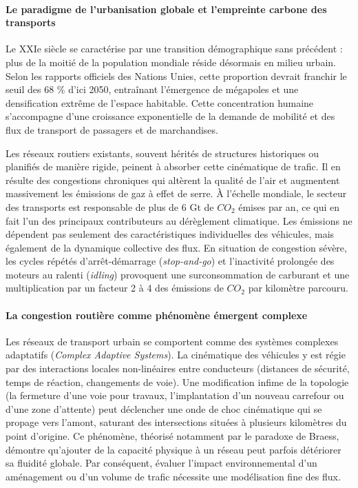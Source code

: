 \documentclass[10pt, a4paper]{article}
\begin{document}
\paragraph{Le paradigme de l'urbanisation globale et l'empreinte carbone
des
transports}\label{le-paradigme-de-lurbanisation-globale-et-lempreinte-carbone-des-transports}

Le XXIe siècle se caractérise par une transition démographique sans
précédent : plus de la moitié de la population mondiale réside désormais
en milieu urbain. Selon les rapports officiels des Nations Unies, cette
proportion devrait franchir le seuil des 68 \% d'ici 2050, entraînant
l'émergence de mégapoles et une densification extrême de l'espace
habitable. Cette concentration humaine s'accompagne d'une croissance
exponentielle de la demande de mobilité et des flux de transport de
passagers et de marchandises.

Les réseaux routiers existants, souvent hérités de structures
historiques ou planifiés de manière rigide, peinent à absorber cette
cinématique de trafic. Il en résulte des congestions chroniques qui
altèrent la qualité de l'air et augmentent massivement les émissions de
gaz à effet de serre. À l'échelle mondiale, le secteur des transports
est responsable de plus de 6 Gt de \(CO_2\) émises par an, ce qui en
fait l'un des principaux contributeurs au dérèglement climatique. Les
émissions ne dépendent pas seulement des caractéristiques individuelles
des véhicules, mais également de la dynamique collective des flux. En
situation de congestion sévère, les cycles répétés d'arrêt-démarrage
(\emph{stop-and-go}) et l'inactivité prolongée des moteurs au ralenti
(\emph{idling}) provoquent une surconsommation de carburant et une
multiplication par un facteur 2 à 4 des émissions de \(CO_2\) par
kilomètre parcouru.

\paragraph{La congestion routière comme phénomène émergent
complexe}\label{la-congestion-routiuxe8re-comme-phuxe9nomuxe8ne-uxe9mergent-complexe}

Les réseaux de transport urbain se comportent comme des systèmes
complexes adaptatifs (\emph{Complex Adaptive Systems}). La cinématique
des véhicules y est régie par des interactions locales non-linéaires
entre conducteurs (distances de sécurité, temps de réaction, changements
de voie). Une modification infime de la topologie (la fermeture d'une
voie pour travaux, l'implantation d'un nouveau carrefour ou d'une zone
d'attente) peut déclencher une onde de choc cinématique qui se propage
vers l'amont, saturant des intersections situées à plusieurs kilomètres
du point d'origine. Ce phénomène, théorisé notamment par le paradoxe de
Braess, démontre qu'ajouter de la capacité physique à un réseau peut
parfois détériorer sa fluidité globale. Par conséquent, évaluer l'impact
environnemental d'un aménagement ou d'un volume de trafic nécessite une
modélisation fine des flux.
\end{document}
